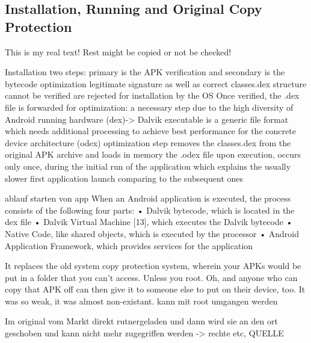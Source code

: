 \subsection{Installation, Running and Original Copy Protection} \label{subsection:android-copy}
This is my real text! Rest might be copied or not be checked!

%
Installation two steps:  primary is the APK verification and secondary is the bytecode optimization\newline
legitimate signature as well as correct classes.dex structure cannot be verified are rejected for installation by the OS\newline
Once verified, the .dex file is forwarded for optimization: a necessary step due to the high diversity of Android running hardware (dex)-> Dalvik executable is a generic file format which needs additional processing to achieve best performance for the concrete device architecture (odex)\newline
optimization\newline
step removes the classes.dex from the original APK archive and loads in memory the .odex file upon execution, occurs only once, during the initial run of the application which explains the usually slower first application launch comparing to the subsequent ones

ablauf starten von app\newline
When an Android application is executed, the process consists of the following four parts:
• Dalvik bytecode, which is located in the dex file
• Dalvik Virtual Machine [13], which executes the Dalvik bytecode
• Native Code, like shared objects, which is executed by the processor
• Android Application Framework, which provides services for the application\newline
\cite{kovachevaMaster}
%


 It replaces the old system copy protection system, wherein your APKs would be put in a folder that you can't access. Unless you root. Oh, and anyone who can copy that APK off can then give it to someone else to put on their device, too. It was so weak, it was almost non-existant.\newline
 kann mit root umgangen werden


Im original vom Markt direkt rutnergeladen und dann wird sie an den ort geschoben und kann nicht mehr zugegriffen werden -> rechte etc, QUELLE\newline
